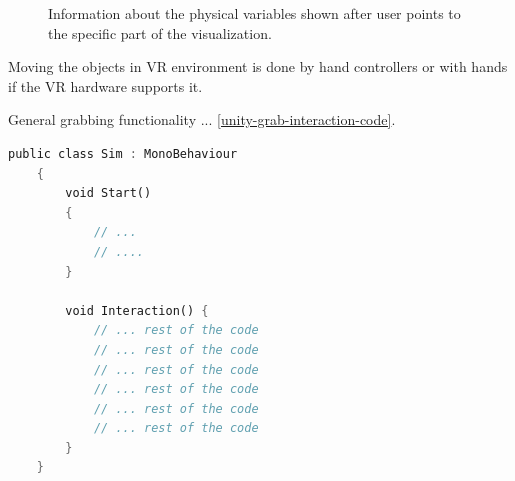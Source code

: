 \begin{figure}[!ht]
	\centering
	\qquad
	\captionsetup{justification=centering}
	\caption{Information about the physical variables shown after user points to the specific part of the visualization.}
	\label{fig:pointer-interaction}
\end{figure}

Moving the objects in VR environment is done by hand controllers or with hands if the VR hardware supports it. 

General grabbing functionality ... \ref{unity-grab-interaction-code}.

\begin{lstlisting}[language=Rust, caption="Grab interaction code.", label=unity-grab-interaction-code]
	public class Sim : MonoBehaviour
	{
		void Start()
		{
			// ...
			// ....
		}
		
		void Interaction() {
			// ... rest of the code
			// ... rest of the code
			// ... rest of the code
			// ... rest of the code
			// ... rest of the code
			// ... rest of the code
		}
	}
\end{lstlisting}

